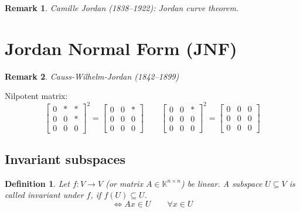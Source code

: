\documentclass{article}
\newtheorem{definition}{Definition}  \numberwithin{definition}{section}
\newtheorem{remark}{Remark}  \numberwithin{remark}{section}
\begin{document}
\begin{remark}
  Camille Jordan (1838--1922): Jordan curve theorem.
\end{remark}

\section{Jordan Normal Form (JNF)} %

\begin{remark}
  Causs-Wilhelm-Jordan (1842--1899)
\end{remark}


Nilpotent matrix:
\[
  \begin{bmatrix} 0 & * & * \\ 0 & 0 & * \\ 0 & 0 & 0 \end{bmatrix}^2
  = \begin{bmatrix} 0 & 0 & * \\ 0 & 0 & 0 \\ 0 & 0 & 0 \end{bmatrix}
  \qquad
  \begin{bmatrix} 0 & 0 & * \\ 0 & 0 & 0 \\ 0 & 0 & 0 \end{bmatrix}^2
  = \begin{bmatrix} 0 & 0 & 0 \\ 0 & 0 & 0 \\ 0 & 0 & 0 \end{bmatrix}
\]

\subsection{Invariant subspaces}

\begin{definition} %
  Let $f: V \to V$ (or matrix $A \in \mathbb K^{n\times n}$) be linear.
  A subspace $U \subseteq V$ is called \emph{invariant} under $f$, if $f(U) \subseteq U$.
  \[ \iff Ax \in U \qquad \forall x \in U \]
\end{definition}
\end{document}
